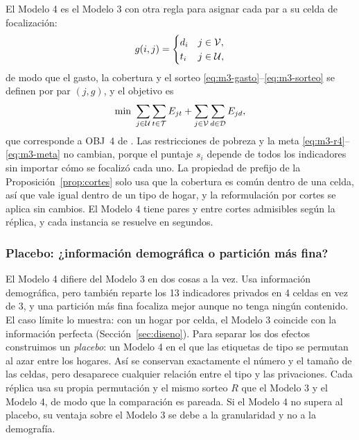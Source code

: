 El Modelo 4 es el Modelo 3 con otra regla para asignar cada par a su celda de
focalización:
\[
g(i,j)=\begin{cases} d_i & j\in\mathcal{V},\\ t_i & j\in\mathcal{U},\end{cases}
\]
de modo que el gasto, la cobertura y el sorteo
\eqref{eq:m3-gasto}--\eqref{eq:m3-sorteo} se definen por par $(j,g)$, y el
objetivo es
\begin{equation}\label{eq:m4-obj}
\min\ \sum_{j\in\Upriv}\sum_{t\in\Tip}\Esf_{jt}+\sum_{j\in\Vpub}\sum_{d\in\Zon}\Esf_{jd},
\end{equation}
que corresponde a OBJ~4 de \citet{hamie2024}. Las restricciones de pobreza y la
meta \eqref{eq:m3-r4}--\eqref{eq:m3-meta} no cambian, porque el puntaje $s_i$
depende de todos los indicadores sin importar cómo se focalizó cada uno. La
propiedad de prefijo de la Proposición~\ref{prop:cortes} solo usa que la
cobertura es común dentro de una celda, así que vale igual dentro de un tipo de
hogar, y la reformulación por cortes se aplica sin cambios. El Modelo 4 tiene
\cParesMcuatro{} pares y entre \cCortesMcuatro{} cortes admisibles según la
réplica, y cada instancia se
resuelve en segundos.

\subsubsection{Placebo: ¿información demográfica o partición más fina?}

El Modelo 4 difiere del Modelo 3 en dos cosas a la vez. Usa información
demográfica, pero también reparte los 13 indicadores privados en 4 celdas en vez
de 3, y una partición más fina focaliza mejor aunque no tenga ningún contenido. El
caso límite lo muestra: con un hogar por celda, el Modelo 3 coincide con la
información perfecta (Sección~\ref{sec:diseno}). Para separar los dos efectos
construimos un \emph{placebo}: un Modelo 4 en el que las etiquetas de tipo se
permutan al azar entre los hogares. Así se conservan exactamente el número y el
tamaño de las celdas, pero desaparece cualquier relación entre el tipo y las
privaciones. Cada réplica usa su propia permutación y el mismo sorteo $R$ que el
Modelo 3 y el Modelo 4, de modo que la comparación es pareada. Si el Modelo 4
no supera al placebo, su ventaja sobre el Modelo 3 se debe a la granularidad y no
a la demografía.
